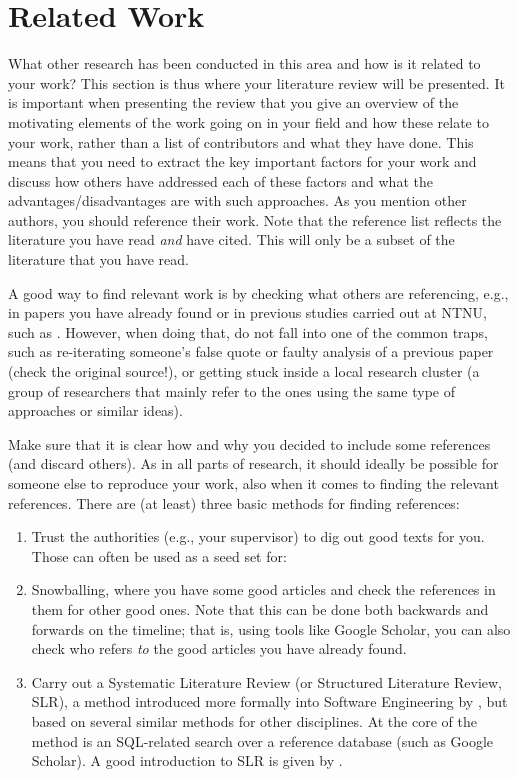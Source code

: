 \chapter{Related Work}
\label{cha:related_work}

What other research has been conducted in this area and how is it related to your work? 
This section is thus where your literature review will be presented. It is important when presenting the review 
that you give an overview of the motivating elements of the work going on in your field and how these relate to your work, 
rather than a list of contributors and what they have done. 
This means that you need to extract the key important factors for your work and discuss how others have addressed 
each of these factors and what the advantages/disadvantages are with such approaches. 
As you mention other authors, you should reference their work.
Note that the reference list reflects the literature you have read {\em and\/} have cited. 
This will only be a subset of the literature that you have read.

A good way to find relevant work is by checking what others are referencing, e.g., in papers you have already found
or in previous studies carried out at NTNU, such as \cite{Berg;Gopinathan:17}.
However, when doing that,
do not fall into one of the common traps, such as re-iterating someone's false quote or faulty analysis of
a previous paper (check the original source!), or getting stuck inside a local research cluster (a group of
researchers that mainly refer to the ones using the same type of approaches or similar ideas).  

Make sure that it is clear how and why you decided to include some references (and discard others). As in all parts of research, it should ideally be possible for someone else to reproduce your work, also when it comes to finding the relevant references.
There are (at least) three basic methods for finding references:
\begin{enumerate}
    \item Trust the authorities (e.g., your supervisor) to dig out good texts for you.
    Those can often be used as a seed set for:
    \item Snowballing, where you have some good articles and check the references in them for other good ones. 
    Note that this can be done both backwards and forwards on the timeline; that is, using tools like Google Scholar, you can also check who refers \textit{to\/} the good articles you have already found.
    \item Carry out a Systematic Literature Review (or Structured Literature Review, SLR), a method introduced more formally into Software Engineering by \citet{Kitchenham;Charters:07}, but based on several similar methods for other disciplines.
    At the core of the method is an SQL-related  search over a reference database (such as Google Scholar).
    A good introduction to SLR is given by \citet{Kofod-Petersen:14}. 
\end{enumerate}

